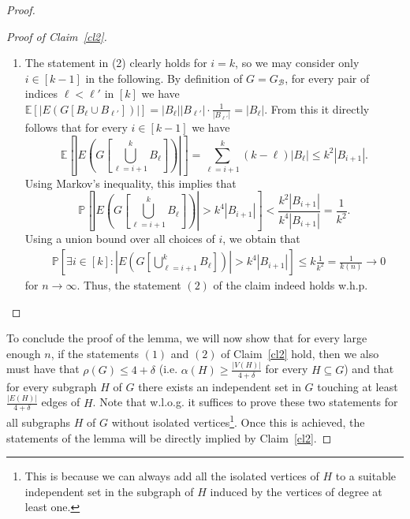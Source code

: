 \documentclass[a4paper,10pt]{amsart}
\begin{document}
\begin{proof}
\begin{proof}[Proof of Claim~\ref{cl2}]
\begin{enumerate}
    \item The statement in (2) clearly holds for $i=k$, so we may consider only $i\in [k-1]$ in the following. By definition of $G=G_{\mathcal{B}}$, for every pair of indices $\ell<\ell'$ in $[k]$ we have $\mathbb{E}\left[|E(G[B_\ell\cup B_{\ell'}])|\right]=|B_\ell||B_{\ell'}|\cdot \frac{1}{|B_{\ell'}|}=|B_{\ell}|$. From this it directly follows that for every $i\in [k-1]$ we have $$\mathbb{E}\left[\left|E\left(G\left[\bigcup_{\ell=i+1}^{k}B_\ell\right]\right)\right|\right]=\sum_{\ell=i+1}^{k}(k-\ell)|B_\ell|\le k^2|B_{i+1}|.$$
    Using Markov's inequality, this implies that
    $$\mathbb{P}\left[\left|E\left(G\left[\bigcup_{\ell=i+1}^{k}B_\ell\right]\right)\right|> k^4|B_{i+1}|\right]<\frac{k^2|B_{i+1}|}{k^4|B_{i+1}|}=\frac{1}{k^2}.$$
    Using a union bound over all choices of $i$, we obtain that
    \begin{align*}
       &\mathbb{P}\left[\exists i \in [k]: \left|E\left(G\left[\bigcup_{\ell=i+1}^{k}B_\ell\right]\right)\right|> k^4|B_{i+1}|\right]\le k\frac{1}{k^2}=\frac{1}{k(n)}\rightarrow 0 
    \end{align*}
    for $n\rightarrow \infty$. Thus, the statement $(2)$ of the claim indeed holds w.h.p.
\end{enumerate}
\end{proof}
To conclude the proof of the lemma, we will now show that for every large enough $n$, if the statements $(1)$ and $(2)$ of Claim~\ref{cl2} hold, then we also must have that $\rho(G)\le 4+\delta$ (i.e. $\alpha(H)\ge \frac{|V(H)|}{4+\delta}$ for every $H\subseteq G$) and that for every subgraph $H$ of $G$ there exists an independent set in $G$ touching at least $\frac{|E(H)|}{4+\delta}$ edges of $H$. Note that w.l.o.g. it suffices to prove these two statements for all subgraphs $H$ of $G$ without isolated vertices\footnote{This is because we can always add all the isolated vertices of $H$ to a suitable independent set in the subgraph of $H$ induced by the vertices of degree at least one.}. Once this is achieved, the statements of the lemma will be directly implied by Claim~\ref{cl2}.


\end{proof}
\end{document}
